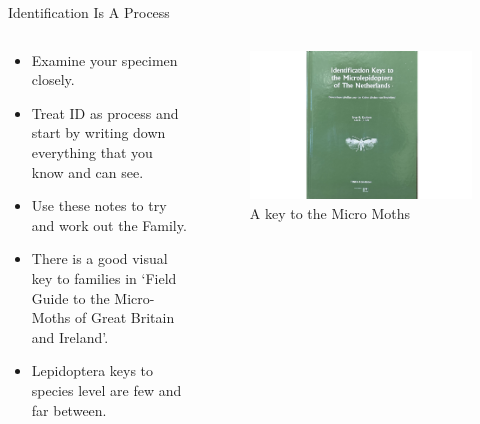\documentclass[
  ignorenonframetext,
]{beamer}
\providecommand{\tightlist}{%
  \setlength{\itemsep}{0pt}\setlength{\parskip}{0pt}}
\begin{document}
\begin{frame}{Identification Is A Process}
\protect\hypertarget{identification-is-a-process}{}
\begin{columns}[T]
\begin{column}{0.5\textwidth}
\begin{itemize}
\tightlist
\item
  Examine your specimen closely.
\item
  Treat ID as process and start by writing down everything that you know
  and can see.
\item
  Use these notes to try and work out the Family.
\item
  There is a good visual key to families in `Field Guide to the
  Micro-Moths of Great Britain and Ireland'.
\item
  Lepidoptera keys to species level are few and far between.
\end{itemize}
\end{column}

\begin{column}{0.5\textwidth}
\begin{figure}
\centering
\includegraphics{./images/micro-lep-key.jpg}
\caption{A key to the Micro Moths}
\end{figure}
\end{column}
\end{columns}
\end{frame}
\end{document}
